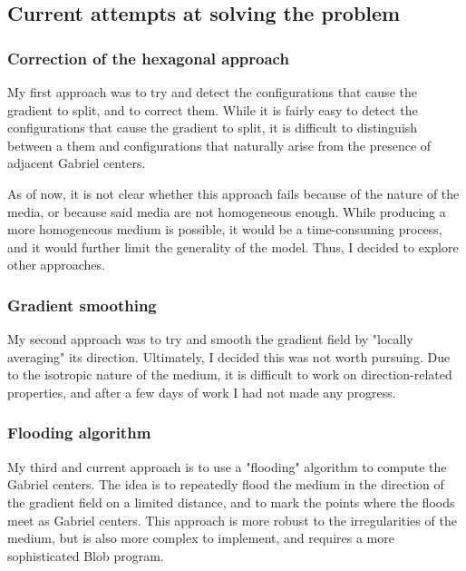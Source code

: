 \documentclass[11pt,a4paper]{report}
\begin{document}
\subsection{Current attempts at solving the problem}

\subsubsection{Correction of the hexagonal approach}

My first approach was to try and detect the configurations that cause the gradient to split, and to correct them. While it is fairly easy to detect the configurations that cause the gradient to split, it is difficult to distinguish between a them and configurations that naturally arise from the presence of adjacent Gabriel centers.

As of now, it is not clear whether this approach fails because of the nature of the media, or because said media are not homogeneous enough. While producing a more homogeneous medium is possible, it would be a time-consuming process, and it would further limit the generality of the model. Thus, I decided to explore other approaches.

\subsubsection{Gradient smoothing}

My second approach was to try and smooth the gradient field by "locally averaging" its direction. Ultimately, I decided this was not worth pursuing. Due to the isotropic nature of the medium, it is difficult to work on direction-related properties, and after a few days of work I had not made any progress.

\subsubsection{Flooding algorithm}

My third and current approach is to use a "flooding" algorithm to compute the Gabriel centers. The idea is to repeatedly flood the medium in the direction of the gradient field on a limited distance, and to mark the points where the floods meet as Gabriel centers. This approach is more robust to the irregularities of the medium, but is also more complex to implement, and requires a more sophisticated Blob program.
\end{document}
